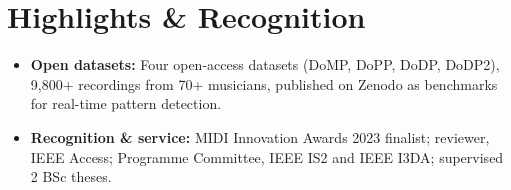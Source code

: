 \documentclass[11pt]{article}
\begin{document}
\enlargethispage{2\baselineskip}
\section*{Highlights \& Recognition}
\begin{itemize}[leftmargin=1.2em, itemsep=-0.25em]
    \item \textbf{Open datasets:} Four open-access datasets (DoMP, DoPP, DoDP, DoDP2), 9,800+ recordings from 70+ musicians, published on Zenodo as benchmarks for real-time pattern detection.
    \item \textbf{Recognition \& service:} MIDI Innovation Awards 2023 finalist; reviewer, IEEE Access; Programme Committee, IEEE IS2 and IEEE I3DA; supervised 2 BSc theses.
\end{itemize}
\end{document}
